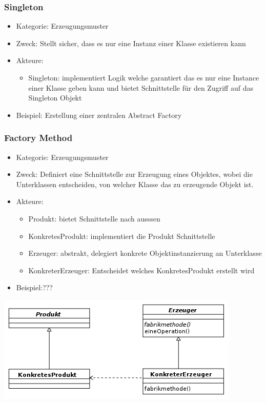 \documentclass[11pt, fleqn, a4paper, leqno]{scrartcl} %
\begin{document}
		\subsubsection{Singleton}
			\begin{itemize}
				\item Kategorie: Erzeugungsmuster
				\item Zweck: Stellt sicher, dass es nur eine Instanz einer Klasse existieren kann
				\item Akteure: 
					\begin{itemize}
						\item Singleton: implementiert Logik welche garantiert das es nur eine Instance einer Klasse geben kann und bietet Schnittstelle für den Zugriff auf das Singleton Objekt
					\end{itemize}
				\item Beispiel: Erstellung einer zentralen Abstract Factory
			\end{itemize}
		\newpage
		\subsubsection{Factory Method}
			\begin{itemize}
				\item Kategorie: Erzeugungsmuster
				\item Zweck: Definiert eine Schnittstelle zur Erzeugung eines Objektes, wobei die Unterklassen entscheiden, von welcher Klasse das zu erzeugende Objekt ist.
				\item Akteure: 
					\begin{itemize}
						\item Produkt: bietet Schnittstelle nach ausssen
						\item KonkretesProdukt: implementiert die Produkt Schnittstelle
						\item Erzeuger: abstrakt, delegiert konkrete Objektinstanzierung an  Unterklasse
						\item KonkreterErzeuger: Entscheidet welches KonkretesProdukt erstellt wird
					\end{itemize}
				\item Beispiel:???
			\end{itemize}
			\includegraphics{images/factory-method.png}
		\newpage
\end{document}
